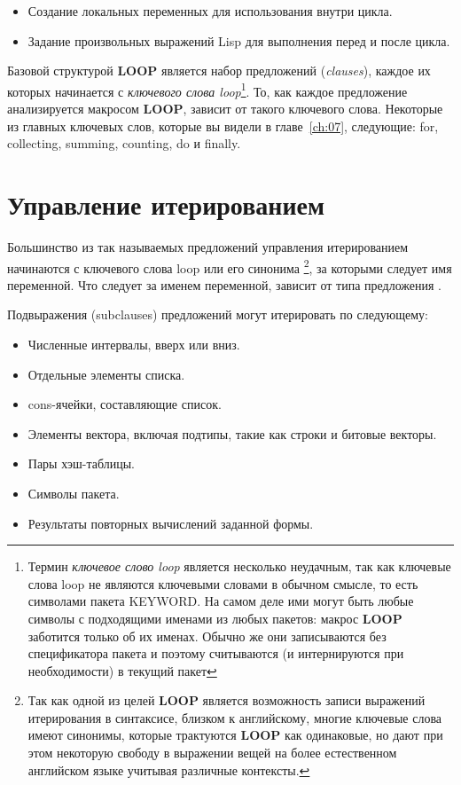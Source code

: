 \begin{itemize}
\item Создание локальных переменных для использования внутри цикла.
\item Задание произвольных выражений Lisp для выполнения перед и после цикла.
\end{itemize}

Базовой структурой \textbf{LOOP} является набор предложений (\textit{clauses}), каждое их
которых начинается с \textit{ключевого слова loop}\footnote{Термин \textit{ключевое слово
    loop} является несколько неудачным, так как ключевые слова loop не являются ключевыми
  словами в обычном смысле, то есть символами пакета KEYWORD. На самом деле ими могут быть
  любые символы с подходящими именами из любых пакетов: макрос \textbf{LOOP} заботится
  только об их именах. Обычно же они записываются без спецификатора пакета и поэтому
  считываются (и интернируются при необходимости) в текущий пакет}. То, как каждое
предложение анализируется макросом \textbf{LOOP}, зависит от такого ключевого
слова. Некоторые из главных ключевых слов, которые вы видели в главе~\ref{ch:07},
следующие: for, collecting, summing, counting, do и finally.
\section{Управление итерированием}


Большинство из так называемых предложений управления итерированием начинаются с ключевого
слова loop  или его синонима \footnote{Так как одной из целей
  \textbf{LOOP} является возможность записи выражений итерирования в синтаксисе, близком к
  английскому, многие ключевые слова имеют синонимы, которые трактуются \textbf{LOOP} как
  одинаковые, но дают при этом некоторую свободу в выражении вещей на более естественном
  английском языке учитывая различные контексты.}, за которыми следует имя переменной. Что
следует за именем переменной, зависит от типа предложения .

Подвыражения (subclauses) предложений  могут итерировать по следующему:
\begin{itemize}
\item Численные интервалы, вверх или вниз.
\item  Отдельные элементы списка.
\item cons-ячейки, составляющие список.
\item Элементы вектора, включая подтипы, такие как строки и битовые векторы.
\item Пары хэш-таблицы.
\item Символы пакета.
\item Результаты повторных вычислений заданной формы.
\end{itemize}

